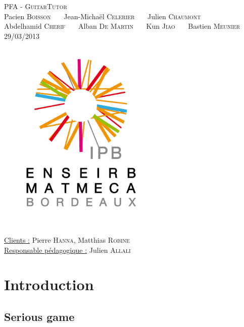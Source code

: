 \documentclass[a4paper,11pt]{article}
\begin{document}
\begin{titlepage}
  \begin{center}

    \textsc{\LARGE PFA - GuitarTutor}\\[2cm]
    Pacien \textsc{Boisson} \ \ \ Jean-Michaël \textsc{Celerier}  \ \ \ Julien \textsc{Chaumont}\\
    Abdelhamid \textsc{Cherif} \ \ \ Alban \textsc{De Martin} \ \ \ Kun \textsc{Jiao} \ \ \ Bastien \textsc{Meunier} \\[3cm]
    \textsc{\large 29/03/2013 }\\[1.5cm]
    \includegraphics[width=8cm]{logo.png}

  \end{center}
  \vspace{3cm}
  \begin{flushleft}
   \underline{Clients :} Pierre \textsc{Hanna}, Matthias \textsc{Robine}\\
   \underline{Responsable pédagogique :} Julien \textsc{Allali}
  \end{flushleft}


\end{titlepage}

\clearpage

\section*{Introduction}

\subsection*{Serious game}
\end{document}
